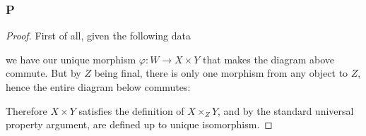 \documentclass{article}
\begin{document}
\subsubsection{P}\label{1.3.P}
\begin{proof}
    First of all, given the following data
    \begin{center}
    \end{center}
    we have our unique morphism $\varphi:W\to X\times Y$ that makes the diagram above commute. But by $Z$ being final, there is only one morphism from any object to $Z$, hence the entire diagram below commutes:
    \begin{center}
    \end{center}
    Therefore $X\times Y$ satisfies the definition of $X\times_ZY$, and by the standard universal property argument, are defined up to unique isomorphism.
\end{proof}
\end{document}
